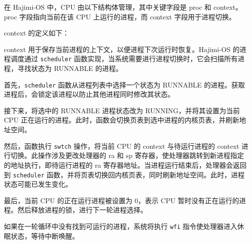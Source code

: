 \documentclass[UTF8]{article}
\begin{document}
      在 Hajimi-OS 中，CPU 由以下结构体管理，其中关键字段是 proc 和 context。proc 字段指向当前在该 CPU 上运行的进程，而 context 字段用于进程切换。
      
      context 的定义如下：
      
      context 用于保存当前进程的上下文，以便进程下次运行时恢复。Hajimi-OS 的进程调度通过 \texttt{scheduler} 函数实现，当系统需要进行进程切换时，它会扫描所有进程，寻找状态为 RUNNABLE 的进程。

      首先，\texttt{scheduler} 函数从进程列表中选择一个状态为 RUNNABLE 的进程。获取进程后，会锁定该进程以防止其他进程同时修改其状态。

      接下来，将选中的 RUNNABLE 进程状态改为 RUNNING，并将其设置为当前 CPU 正在运行的进程。此时，函数会切换页表到选中进程的内核页表，并刷新地址空间。

      然后，函数执行 \texttt{swtch} 操作，将当前 CPU 的 context 与待运行进程的 context 进行切换。此操作涉及更改处理器的 ra 和 sp 寄存器，使处理器跳转到新进程指定的地址执行，即待运行进程的 ra 寄存器地址。当进程运行结束后，处理器会返回到 \texttt{scheduler} 函数，并将页表切换回内核页表，同时刷新地址空间。此时，进程状态可能已发生变化。

      最后，当前 CPU 的正在运行进程被设置为 0，表示 CPU 暂时没有正在运行的进程。然后释放进程的锁，进行下一轮进程选择。

      如果在一轮循环中没有找到可运行的进程，系统将执行 \texttt{wfi} 指令使处理器进入休眠状态，等待中断唤醒。
      
\end{document}
